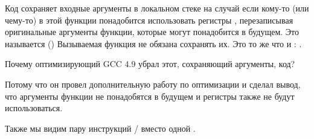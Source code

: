 Код сохраняет входные аргументы в локальном стеке на случай если кому-то (или чему-то) в этой функции
понадобится использовать регистры , перезаписывая оригинальные аргументы функции, которые
могут понадобится в будущем.
Это называется  (\ARMPCS)
Вызываемая функция не обязана сохранять их.
Это то же что и : .

Почему оптимизирующий GCC 4.9 убрал этот, сохраняющий аргументы, код?

Потому что он провел дополнительную работу по оптимизации и сделал вывод, 
что аргументы функции не понадобятся в будущем и регистры  также не будут использоваться.

Также мы видим пару инструкций / вместо одной .

